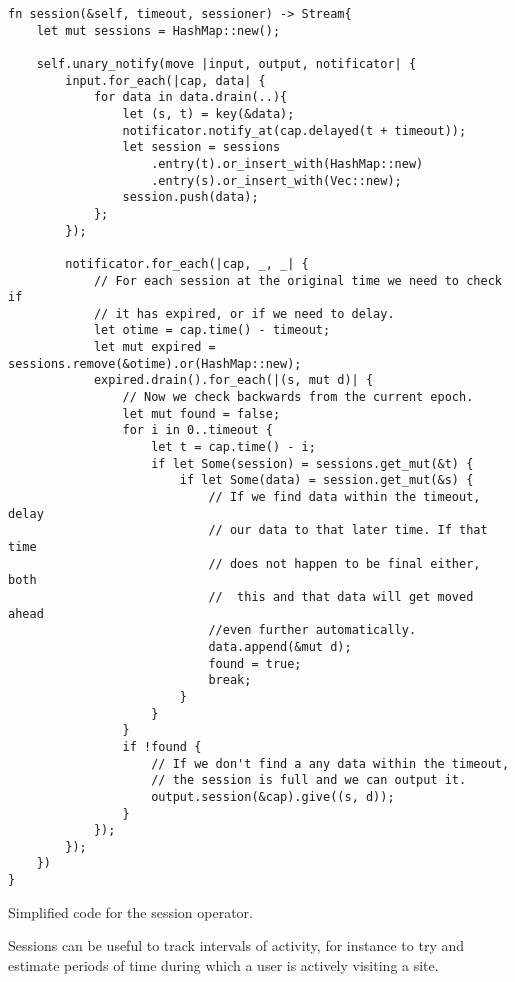 \begin{listing}[H]
\begin{verbatim}
fn session(&self, timeout, sessioner) -> Stream{
    let mut sessions = HashMap::new();
    
    self.unary_notify(move |input, output, notificator| {
        input.for_each(|cap, data| {
            for data in data.drain(..){
                let (s, t) = key(&data);
                notificator.notify_at(cap.delayed(t + timeout));
                let session = sessions
                    .entry(t).or_insert_with(HashMap::new)
                    .entry(s).or_insert_with(Vec::new);
                session.push(data);
            };
        });
        
        notificator.for_each(|cap, _, _| {
            // For each session at the original time we need to check if
            // it has expired, or if we need to delay.
            let otime = cap.time() - timeout;
            let mut expired = sessions.remove(&otime).or(HashMap::new);
            expired.drain().for_each(|(s, mut d)| {
                // Now we check backwards from the current epoch.
                let mut found = false;
                for i in 0..timeout {
                    let t = cap.time() - i;
                    if let Some(session) = sessions.get_mut(&t) {
                        if let Some(data) = session.get_mut(&s) {
                            // If we find data within the timeout, delay
                            // our data to that later time. If that time
                            // does not happen to be final either, both
                            //  this and that data will get moved ahead
                            //even further automatically.
                            data.append(&mut d);
                            found = true;
                            break;
                        }
                    }
                }
                if !found {
                    // If we don't find a any data within the timeout,
                    // the session is full and we can output it.
                    output.session(&cap).give((s, d));
                }
            });
        });
    })
}
\end{verbatim}
  \caption{Simplified code for the session operator.}
  \label{lst:session}
\end{listing}

Sessions can be useful to track intervals of activity, for instance to try and estimate periods of time during which a user is actively visiting a site.

